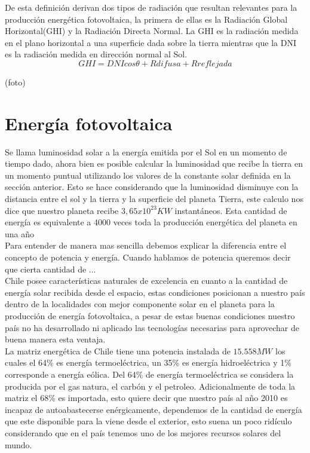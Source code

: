 De esta definición derivan dos tipos de radiación que resultan relevantes para la producción energética fotovoltaica, la primera de ellas es la Radiación Global Horizontal(GHI) y la Radiación Directa Normal. La GHI es la radiación medida en el plano horizontal a una superficie dada sobre la tierra mientras que la DNI es la radiación medida en dirección normal al Sol. $$ GHI = DNI cos \theta + Rdifusa + Rreflejada $$

(foto)

\section{Energía fotovoltaica}
Se llama luminosidad solar a la energía emitida por el Sol en un momento de tiempo dado, ahora bien es posible calcular la luminosidad que recibe la tierra en un momento puntual utilizando los valores de la constante solar definida en la sección anterior. Esto se hace considerando que la luminosidad disminuye con la distancia entre el sol y la tierra y la superficie del planeta Tierra, este calculo nos dice que nuestro planeta recibe  $3,65 x {10}^{23} KW$ instantáneos. Esta cantidad de energía es equivalente a 4000 veces toda la producción energética del planeta en una año\\

Para entender de manera mas sencilla debemos explicar la diferencia entre el concepto de potencia y energía. Cuando hablamos de potencia queremos decir que cierta cantidad de ...\\

Chile posee características naturales de excelencia en cuanto a la cantidad de energía solar recibida desde el espacio, estas condiciones posicionan a nuestro país dentro de la localidades con mejor componente solar en el planeta para la producción de energía fotovoltaica, a pesar de estas buenas condiciones nuestro país no ha desarrollado ni aplicado las tecnologías necesarias para aprovechar de buena manera esta ventaja.\\

La matriz energética de Chile tiene una potencia instalada de $15.558 MW$\cite{matrizEnergia:1} los cuales el 64\% es energía termoeléctrica, un 35\% es energía hidroeléctrica y 1\% corresponde a energía eólica. Del 64\% de energía termoeléctrica se considera la producida por el gas natura, el carbón y el petroleo. Adicionalmente de toda la matriz el 68\% es importada\cite{colegioIng:1}, esto quiere decir que nuestro país al año 2010 es incapaz de autoabastecerse enérgicamente, dependemos de la cantidad de energía que este disponible para la viene desde el exterior, esto suena un poco ridículo considerando que en el país tenemos uno de los mejores recursos solares del mundo.\\

